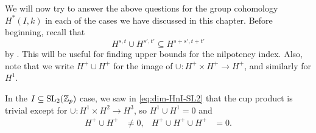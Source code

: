 We will now try to answer the above questions for the group cohomology $H^{*}(I,k)$ in each of the cases we have discussed in this chapter. Before beginning, recall that
\begin{equation}\label{eq:graded-coh-inc}
  H^{s,t} \cup H^{s',t'} \subseteq H^{s+s',t+t'}
\end{equation}
by \cite[§3.7]{Fuks}. This will be useful for finding upper bounds for the nilpotency index. Also, note that we write $H^{+} \cup H^{+}$ for the image of $\cup \colon H^{+} \times H^{+} \to H^{+}$, and similarly for $H^{1}$.

In the $I \subseteq \operatorname{SL}_{2}(\mathbb{Z}_{p})$ case, we saw in \eqref{eq:dim-HnI-SL2} that the cup product is trivial except for $\cup \colon H^{1} \times H^{2} \to H^{3}$, so $H^{1} \cup H^{1} = 0$ and
\begin{align*}
  H^{+} \cup H^{+} &\neq 0, & H^{+} \cup H^{+} \cup H^{+} &= 0.
\end{align*}

